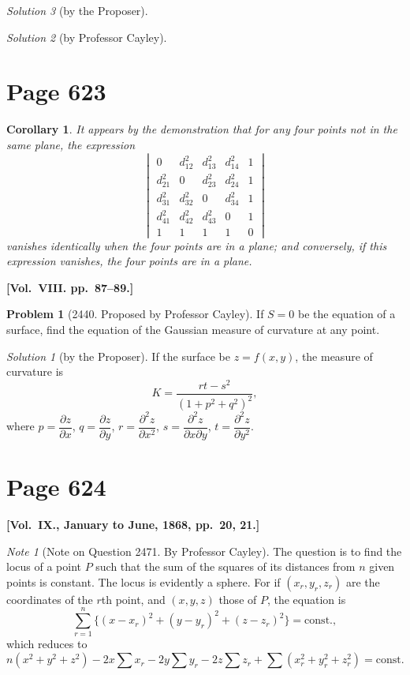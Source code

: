 \documentclass[12pt,a4paper]{article}
\theoremstyle{plain}
\newtheorem{corollary}{Corollary}
\theoremstyle{definition}
\newtheorem{problem}{Problem}
\theoremstyle{remark}
\newtheorem*{solution}{Solution}
\newtheorem*{note}{Note}
\begin{document}
\begin{solution}[by the Proposer]
\begin{solution}[by Professor Cayley]
\section*{Page 623}
\setcounter{page}{623}

\begin{corollary}
It appears by the demonstration that for any four points not in the same plane, the expression
\[
\begin{vmatrix}
0 & d_{12}^2 & d_{13}^2 & d_{14}^2 & 1 \\
d_{21}^2 & 0 & d_{23}^2 & d_{24}^2 & 1 \\
d_{31}^2 & d_{32}^2 & 0 & d_{34}^2 & 1 \\
d_{41}^2 & d_{42}^2 & d_{43}^2 & 0 & 1 \\
1 & 1 & 1 & 1 & 0
\end{vmatrix}
\]
vanishes identically when the four points are in a plane; and conversely, if this expression vanishes, the four points are in a plane.
\end{corollary}

\medskip\noindent\textbf{[Vol.~VIII. pp.~87--89.]}

\begin{problem}[2440. Proposed by Professor Cayley]
If $S = 0$ be the equation of a surface, find the equation of the Gaussian measure of curvature at any point.
\end{problem}

\begin{solution}[by the Proposer]
If the surface be $z = f(x, y)$, the measure of curvature is
\[
K = \frac{rt - s^2}{(1 + p^2 + q^2)^2},
\]
where $p = \dfrac{\partial z}{\partial x}$, $q = \dfrac{\partial z}{\partial y}$, $r = \dfrac{\partial^2 z}{\partial x^2}$, $s = \dfrac{\partial^2 z}{\partial x\partial y}$, $t = \dfrac{\partial^2 z}{\partial y^2}$.
\end{solution}

\section*{Page 624}
\setcounter{page}{624}

\medskip\noindent\textbf{[Vol.~IX., January to June, 1868, pp.~20, 21.]}

\begin{note}[Note on Question 2471. By Professor Cayley]
The question is to find the locus of a point $P$ such that the sum of the squares of its distances from $n$ given points is constant. The locus is evidently a sphere. For if $(x_r, y_r, z_r)$ are the coordinates of the $r$th point, and $(x, y, z)$ those of $P$, the equation is
\[
\sum_{r=1}^n \{(x - x_r)^2 + (y - y_r)^2 + (z - z_r)^2\} = \text{const.},
\]
which reduces to
\[
n(x^2 + y^2 + z^2) - 2x\sum x_r - 2y\sum y_r - 2z\sum z_r + \sum(x_r^2 + y_r^2 + z_r^2) = \text{const.}
\]
\end{note}


\end{solution}
\end{solution}
\end{document}
